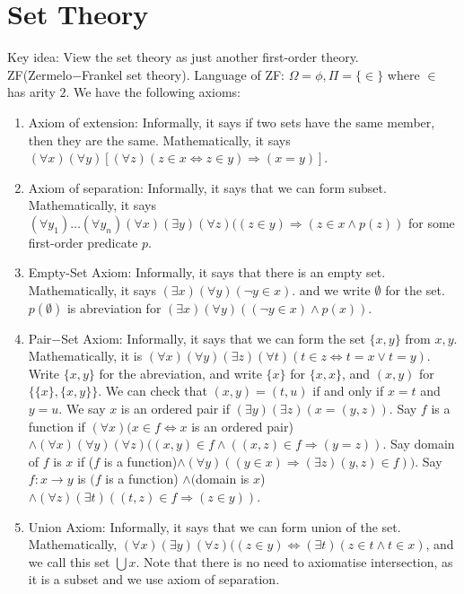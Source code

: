 \section{Set Theory}
Key idea: View the set theory as just another first-order theory.\\
ZF(Zermelo$-$Frankel set theory). Language of ZF: $\Omega = \phi, \Pi =\{\in\}$ where $\in$ has arity $2$.
We have the following axioms:
\begin{enumerate}
\item Axiom of extension: Informally, it says if two sets have the same member, then they are the same. Mathematically, it says
    $(\forall x)(\forall y)[(\forall z)(z \in x \iff z \in y) \Rightarrow (x=y)]$.\\
\item Axiom of separation: Informally, it says that we can form subset. Mathematically, it says $(\forall y_1) \ldots (\forall y_n)(\forall x)(\exists y)(\forall z)((z \in y) \Rightarrow (z \in x \wedge p(z))$ for some first-order predicate $p$.\\
\item Empty-Set Axiom: Informally, it says that there is an empty set. Mathematically, it says $(\exists x)(\forall y)(\neg y \in x)$.
    and we write $\emptyset$ for the set. $p(\emptyset)$ is abreviation for $(\exists x)(\forall y)((\neg y \in x) \wedge p(x))$.\\
\item Pair$-$Set Axiom: Informally, it says that we can form the set $\{x,y\}$ from $x,y$. Mathematically, it is $(\forall x)(\forall y)(\exists z)(\forall t)(t \in z \iff t=x \vee t=y)$. Write $\{x,y\}$ for the abreviation, and write $\{x\}$ for $\{x,x\}$, and $(x,y)$ for $\{ \{x\},\{x,y\}\}$. We can check that $(x,y)=(t,u)$ if and only if $x=t$ and $y=u$. We say $x$ is an ordered pair if $(\exists y)(\exists z)(x=(y,z))$. Say $f$ is a function if $(\forall x)(x \in f \iff x$ is an ordered pair)$ \wedge (\forall x)(\forall y)(\forall z)((x,y) \in f \wedge ((x,z) \in f \Rightarrow (y=z))$. Say domain of $f$ is $x$ if ($f$ is a function)$ \wedge (\forall y)((y \in x) \Rightarrow (\exists z)(y,z) \in f))$. Say $f: x \rightarrow y$ is $(f$ is a function) $\wedge ($domain is $x$) $\wedge (\forall z)(\exists t)((t,z) \in f \Rightarrow (z \in y))$.\\
\item Union Axiom: Informally, it says that we can form union of the set. Mathematically, $(\forall x)(\exists y)(\forall z)((z \in y) \iff (\exists t)(z \in t \wedge t \in x)$, and we call this set $\bigcup x$. Note that there is no need to axiomatise intersection, as it is a subset and we use axiom of separation.\\

\end{enumerate}
